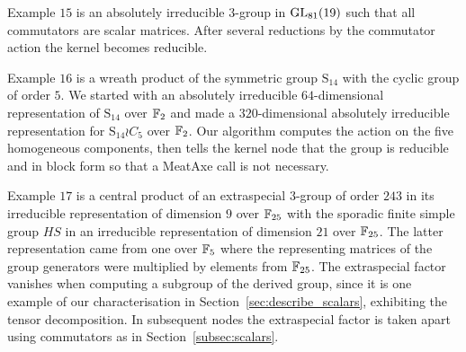 Example  $15$ is an absolutely irreducible $3$-group in $\GL_{81}(19)$ such 
that all commutators are scalar matrices. After several reductions by the 
commutator action the kernel becomes reducible.

Example  $16$ is a wreath product of the symmetric group $\mathrm{S}_{14}$
with the cyclic group of order $5$. We started with an absolutely irreducible 
$64$-dimensional representation of $\mathrm{S}_{14}$ over $\mathbb{F}_2$ and made
 a $320$-dimensional absolutely irreducible representation for 
$\mathrm{S}_{14} \wr C_5$ over $\mathbb{F}_2$. Our algorithm computes the action on 
the five homogeneous components, then tells the kernel node that the 
group is reducible and in block form so that a MeatAxe 
call is not necessary. 


Example $17$ is a central product of an extraspecial $3$-group of
order $243$ in its irreducible representation of dimension $9$ over
$\mathbb{F}_{25}$ with the sporadic finite simple group $HS$ in an irreducible
representation of dimension $21$ over $\mathbb{F}_{25}$. The latter
representation came from one over $\mathbb{F}_5$ where the representing
matrices of the group generators were multiplied by elements from 
$\mathbb{F}_{25}$. The extraspecial factor vanishes
when computing a subgroup of the derived group, since it is 
one example of our characterisation in 
Section~\ref{sec:describe_scalars},
 exhibiting the tensor
decomposition. In subsequent nodes the extraspecial
factor is taken apart using commutators as in
Section~\ref{subsec:scalars}. %

